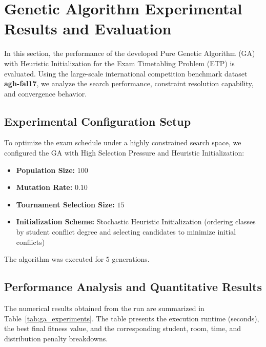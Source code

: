 
\section{Genetic Algorithm Experimental Results and Evaluation}
\label{sec:ga_experimental_results}

In this section, the performance of the developed Pure Genetic Algorithm (GA) with Heuristic Initialization for the Exam Timetabling Problem (ETP) is evaluated. Using the large-scale international competition benchmark dataset \textbf{agh-fal17}, we analyze the search performance, constraint resolution capability, and convergence behavior.

\subsection{Experimental Configuration Setup}
\label{subsec:experimental_configurations}

To optimize the exam schedule under a highly constrained search space, we configured the GA with High Selection Pressure and Heuristic Initialization:
\begin{itemize}
    \item \textbf{Population Size:} $100$
    \item \textbf{Mutation Rate:} $0.10$
    \item \textbf{Tournament Selection Size:} $15$
    \item \textbf{Initialization Scheme:} Stochastic Heuristic Initialization (ordering classes by student conflict degree and selecting candidates to minimize initial conflicts)
\end{itemize}

The algorithm was executed for $5$ generations.

\subsection{Performance Analysis and Quantitative Results}
\label{subsec:performance_comparisons}

The numerical results obtained from the run are summarized in Table~\ref{tab:ga_experiments}. The table presents the execution runtime (seconds), the best final fitness value, and the corresponding student, room, time, and distribution penalty breakdowns.

